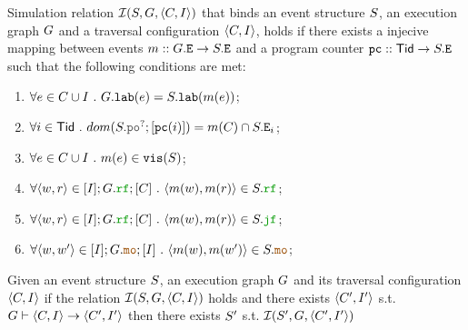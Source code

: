 \documentclass[12pt]{article}
\begin{document}
\begin{definition}
  Simulation relation $\mathcal{I}(S, G, \langle C, I \rangle)$ that binds an 
  event structure $S$, an \imm execution graph $G$ and 
  a traversal configuration $\langle C, I \rangle$,
  holds if there exists a injecive mapping between events $m :: G.{\mathtt{E}} \rightarrow S.{\mathtt{E}}$
  and a program counter ${\mathtt{pc}} :: \mathsf{Tid} \rightarrow S.{\mathtt{E}}$
  such that the following conditions are met:
  \begin{enumerate}[label=\textbf{S.\arabic*}]
    \item \label{item:sim-lab} 
      $\forall{e \in C\cup I} ~.~ G.{\mathtt{lab}}(e) = S.{\mathtt{lab}}(m(e))$;
    \item \label{item:sim-pc} 
      $\forall{i \in \Tid} ~.~ \lDOM(\lES.\lPO^?;[\lPC(i)]) = \lM(\lC) \cap \lES.\lE_i$;
    \item \label{item:sim-vis} 
      $\forall{e \in C\cup I} ~.~ m(e) \in {\mathtt{vis}}(S)$;
    \item \label{item:sim-rf-i} 
      $\forall{\tup{w, r} \in [\lI];\lG.\lRF;[\lC] ~.~ \tup{\lM(w), \lM(r)} \in \lES.\lRF}$;
    \item \label{item:sim-rf-c} 
      $\forall{\tup{w, r} \in [\lI];\lG.\lRF;[\lC] ~.~ \tup{\lM(w), \lM(r)} \in \lES.\lJF}$;
    \item \label{item:sim-mo}
      $\forall{\tup{w, w'} \in [\lI];\lG.\lMO;[\lI] ~.~ \tup{\lM(w), \lM(w')} \in \lES.\lMO}$;
  \end{enumerate}
\end{definition}

\begin{lemma}
  Given an event structure $S$, an \imm execution graph $G$ 
  and its traversal configuration $\langle C, I \rangle$
  if the relation $\mathcal{I}(S, G, \langle C, I \rangle)$ holds and 
  there exists $\langle C', I' \rangle$ s.t. $G \vdash \langle C, I \rangle \rightarrow \langle C', I' \rangle$
  then there exists $S'$ s.t. $\mathcal{I}(S', G, \langle C', I' \rangle)$ 
\end{lemma}
\end{document}
